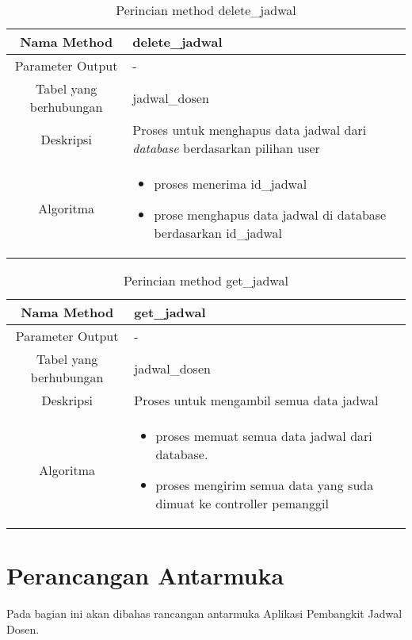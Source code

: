\begin{center}
\begin{table}[H]
\begin{tabular}{|c|p{11cm}|}
\hline
Nama Method 	& 	delete\_jadwal 	\\
\hline
Parameter Output & - \\
\hline
Tabel yang berhubungan & jadwal\_dosen \\
\hline
Deskripsi	& Proses untuk menghapus data jadwal dari \textit{database} berdasarkan pilihan user \\
\hline
Algoritma	& \begin{itemize}
				\item proses menerima id\_jadwal
				\item prose menghapus data jadwal di database berdasarkan id\_jadwal
				\end{itemize} \\
\hline
\end{tabular}
\caption{Perincian method delete\_jadwal}
\end{table}
\end{center}


\begin{center}
\begin{table}[H]
\begin{tabular}{|c|p{11cm}|}
\hline
Nama Method 	& 	get\_jadwal 	\\
\hline
Parameter Output & - \\
\hline
Tabel yang berhubungan & jadwal\_dosen \\
\hline
Deskripsi	& Proses untuk mengambil semua data jadwal \\
\hline
Algoritma	& \begin{itemize}
				\item proses memuat semua data jadwal dari database.
				\item proses mengirim semua data yang suda dimuat ke controller pemanggil
				\end{itemize} \\
\hline
\end{tabular}
\caption{Perincian method get\_jadwal}
\end{table}
\end{center}


\section{Perancangan Antarmuka}
Pada bagian ini akan dibahas rancangan antarmuka Aplikasi Pembangkit Jadwal Dosen.

